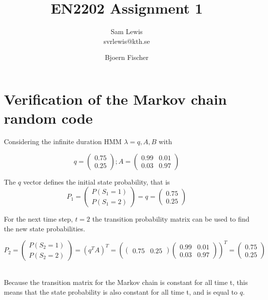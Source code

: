 \documentclass[11pt]{article}   %
\begin{document}
\setlength{\parindent}{0.00in}

\title{EN2202 Assignment 1}

\author{
 Sam Lewis\\
 svrlewis@kth.se
  \and
  Bjoern Fischer  
}
\date{} 
\maketitle
\linespread{1.5}

\section{Verification of the Markov chain random code}

Considering the infinite duration HMM $\lambda = {q, A, B}$ with

$$q =\begin{pmatrix} 0.75 \\ 0.25 \end{pmatrix} ;  A = \begin{pmatrix} 0.99 & 0.01 \\ 0.03 & 0.97 \end{pmatrix} $$

The $q$ vector defines the initial state probability, that is  
$$P_1 = \begin{pmatrix} P(S_1 = 1) \\ P(S_1 = 2) \end{pmatrix} = q =\begin{pmatrix} 0.75 \\ 0.25 \end{pmatrix}  $$

For the next time step, $t = 2$ the transition probability matrix can be used to find the new state probabilities. 

$$P_2 = \begin{pmatrix} P(S_2 = 1) \\ P(S_2 = 2) \end{pmatrix} = (q^TA)^T = 
(\begin{pmatrix} 0.75  & 0.25 \end{pmatrix} \begin{pmatrix} 0.99 & 0.01 \\ 0.03 & 0.97 \end{pmatrix})^T =  \begin{pmatrix} 0.75 \\ 0.25 \end{pmatrix}  $$\

Because the transition matrix for the Markov chain is constant for all time t, this means that the state probability is also constant for all time t, and is equal to $q$. \\
\end{document}
